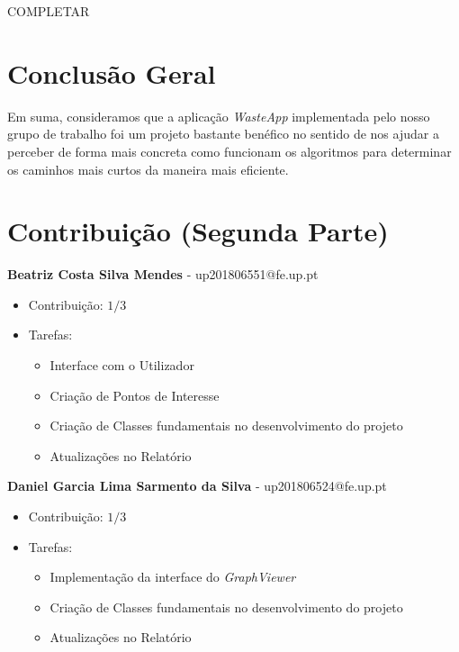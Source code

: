 \documentclass[article, a4paper, 12pt, oneside]{memoir}
\begin{document}
{\Large COMPLETAR}





\newpage
\chapter[Conclusão Geral][Conclusão Geral]{Conclusão Geral} \label{\thechapter}

Em suma, consideramos que a aplicação \textit{WasteApp} implementada pelo nosso grupo de trabalho foi um projeto bastante benéfico no sentido de nos ajudar a perceber de forma mais concreta como funcionam os algoritmos para determinar os caminhos mais curtos da maneira mais eficiente.

\newpage
\chapter[Contribuição (Segunda Parte)][Contribuição (Segunda Parte)]{Contribuição (Segunda Parte)} \label{\thechapter}

\textbf{Beatriz Costa Silva Mendes} - up201806551@fe.up.pt

\begin{itemize}
\item Contribuição: $1/3$
\item Tarefas:
	\begin{itemize}
	\item Interface com o Utilizador
	\item Criação de Pontos de Interesse
	\item Criação de Classes fundamentais no desenvolvimento do projeto
	\item Atualizações no Relatório	
	\end{itemize}
\end{itemize}


\textbf{Daniel Garcia Lima Sarmento da Silva} - up201806524@fe.up.pt

\begin{itemize}
\item Contribuição: $1/3$
\item Tarefas:
	\begin{itemize}
	\item Implementação da interface do \textit{GraphViewer}
	\item Criação de Classes fundamentais no desenvolvimento do projeto
	\item Atualizações no Relatório
	\end{itemize}
\end{itemize}
\end{document}
